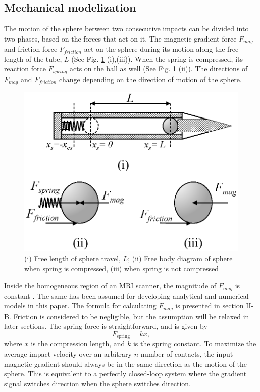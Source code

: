 \documentclass[letterpaper, 10 pt, conference]{ieeeconf}  %
\begin{document}
\subsection{Mechanical modelization}
The motion of the sphere between two consecutive impacts can be divided into two  phases, based on the forces that act on it. The magnetic gradient force $F_{mag}$ and friction force $F_{friction}$ act on the sphere during its motion along the free length of the tube, $L$ (See Fig. \ref{FBD} (i),(iii)). When the spring is compressed, its reaction force $F_{spring}$ acts on the ball as well (See Fig. \ref{FBD} (ii)). The directions of $F_{mag}$ and $F_{friction}$  change depending on the direction of motion of the sphere. 
\begin{figure}
	\includegraphics[width=\linewidth]{FBD.eps}
	\caption{(i) Free length of sphere travel, $L$; (ii) Free body diagram of sphere when spring is compressed, (iii) when spring is not compressed}
	\label{FBD}
\end{figure}
Inside the homogeneous region of an MRI scanner, the magnitude of $F_{mag}$ is constant \cite{CMR:CMR20163}. The same has been assumed for developing analytical and numerical models in this paper. The formula for calculating $F_{mag}$ is presented in section II-B. Friction is considered to be negligible, but the assumption will be relaxed in later sections. The spring force is straightforward, and is given by
\begin{equation}
F_{\text{spring}}=k x,
\label{spring_force}
\end{equation}
where $x$ is the compression length, and $k$ is the spring constant. To maximize the average impact velocity over an arbitrary $n$ number of contacts, the input magnetic gradient should always be in the same direction as the motion of the sphere. This is equivalent to a perfectly closed-loop system where the gradient signal switches direction when the sphere switches direction.
\end{document}
